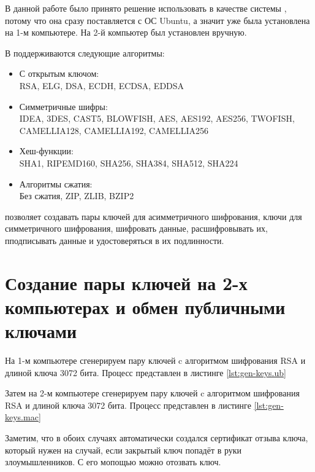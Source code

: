 В данной работе было принято решение использовать в качестве  системы , потому что она сразу поставляется с ОС Ubuntu, а значит уже была установлена на 1-м компьютере. На 2-й компьютер  был установлен вручную.

В  поддерживаются следующие алгоритмы:
\begin{itemize}
	\item С открытым ключом:\\RSA, ELG, DSA, ECDH, ECDSA, EDDSA
	\item Симметричные шифры:\\IDEA, 3DES, CAST5, BLOWFISH, AES, AES192, AES256, TWOFISH, CAMELLIA128, CAMELLIA192, CAMELLIA256
	\item Хеш-функции:\\SHA1, RIPEMD160, SHA256, SHA384, SHA512, SHA224
	\item Алгоритмы сжатия:\\Без сжатия, ZIP, ZLIB, BZIP2
\end{itemize}

 позволяет создавать пары ключей для асимметричного шифрования, ключи для симметричного шифрования, шифровать данные, расшифровывать их, пподписывать данные и удостоверяться в их подлинности.
             
\section{Создание пары  ключей на 2-х компьютерах и обмен публичными ключами}

На 1-м компьютере сгенерируем пару  ключей c алгоритмом шифрования RSA и длиной ключа 3072 бита. Процесс представлен в листинге \ref{lst:gen-keys.ub}



Затем на 2-м компьютере сгенерируем пару  ключей c алгоритмом шифрования RSA и длиной ключа 3072 бита. Процесс представлен в листинге \ref{lst:gen-keys.mac}



Заметим, что в обоих случаях автоматически создался сертификат отзыва ключа, который нужен на случай, если закрытый ключ попадёт в руки злоумышленников. С его мопощью можно отозвать ключ.

